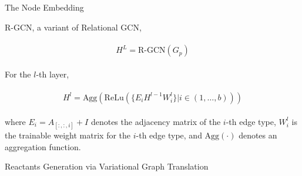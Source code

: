 \documentclass{beamer}		%
\begin{document}
\begin{frame}{The Node Embedding}

R-GCN, a variant of Relational GCN,

\begin{eqnarray}
\begin{aligned}
H^L = \text{R-GCN}(G_p)
\end{aligned}    
\end{eqnarray}

For the $l$-th layer,

\begin{eqnarray}
\begin{aligned}
H^l = \text{Agg} (\text{ReLu} ( \{E_i H^{l-1} W_i^l\} | i \in (1, \ldots, b)))
\end{aligned}    
\end{eqnarray}

where $E_i = A_{[:,:,i]} + I$ denotes the adjacency matrix of the $i$-th edge type, $W_i^l$ is the trainable weight matrix for the $i$-th edge type, and $\text{Agg} (\cdot)$ denotes an aggregation function.



\end{frame}








\begin{frame}[noframenumbering]

\begin{itemize}

    \begin{LARGE}
    
    \item {}
    
    \item {}
    
    \item Reactants Generation via Variational Graph Translation

    \end{LARGE}
    
\end{itemize}
	
\end{frame}
\end{document}
